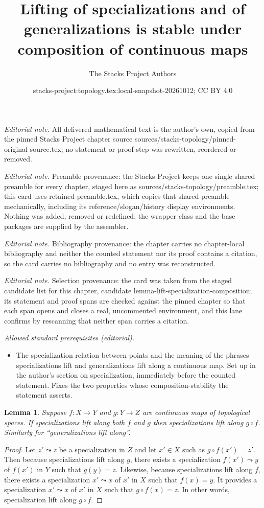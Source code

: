 \documentclass[10pt,a4paper]{amsart}
\title{Lifting of specializations and of generalizations is stable under composition of continuous maps}
\author{The Stacks Project Authors}
\date{stacks-project:topology.tex:local-snapshot-20261012; CC BY 4.0}
\theoremstyle{plain}
\newtheorem{lemma}[subsection]{Lemma}
\theoremstyle{definition}
\theoremstyle{remark}
\numberwithin{equation}{subsection}
\begin{document}
\maketitle
\noindent\textit{Editorial note.} All delivered mathematical text is the author's own, copied from the pinned Stacks Project chapter source sources/stacks-topology/pinned-original-source.tex; no statement or proof step was rewritten, reordered or removed.\par\medskip
\noindent\textit{Editorial note.} Preamble provenance: the Stacks Project keeps one single shared preamble for every chapter, staged here as sources/stacks-topology/preamble.tex; this card uses retained-preamble.tex, which copies that shared preamble mechanically, including its reference/slogan/history display environments. Nothing was added, removed or redefined; the wrapper class and the base packages are supplied by the assembler.\par\medskip
\noindent\textit{Editorial note.} Bibliography provenance: the chapter carries no chapter-local bibliography and neither the counted statement nor its proof contains a citation, so the card carries no bibliography and no entry was reconstructed.\par\medskip
\noindent\textit{Editorial note.} Selection provenance: the card was taken from the staged candidate list for this chapter, candidate lemma-lift-specialization-composition; its statement and proof spans are checked against the pinned chapter so that each span opens and closes a real, uncommented environment, and this lane confirms by rescanning that neither span carries a citation.\par\medskip
\noindent\textit{Allowed standard prerequisites (editorial).}\begin{itemize}
\item The specialization relation between points and the meaning of the phrases specializations lift and generalizations lift along a continuous map. Set up in the author's section on specialization, immediately before the counted statement. Fixes the two properties whose composition-stability the statement asserts.
\end{itemize}\medskip
\begin{lemma}
\label{lemma-lift-specialization-composition}
Suppose $f : X \to Y$ and $g : Y \to Z$ are continuous maps
of topological spaces. If specializations lift along both $f$ and $g$
then specializations lift along $g \circ f$. Similarly for
``generalizations lift along''.
\end{lemma}

\begin{proof}
Let $z'\leadsto z$ be a specialization in $Z$ and let $x' \in X$ such as
$g\circ f (x') = z'$. Then because specializations lift along $g$, there exists
a specialization $f(x') \leadsto y$ of $f(x')$ in $Y$ such that $g(y) = z$.
Likewise, because specializations lift along $f$, there exists a specialization
$x' \leadsto x$ of $x'$ in $X$ such that $f(x) = y$. It provides a
specialization $x' \leadsto x$ of $x'$ in $X$ such that $g\circ f(x) = z$. In
other words, specialization lift along $g\circ f$.
\end{proof}
\end{document}
